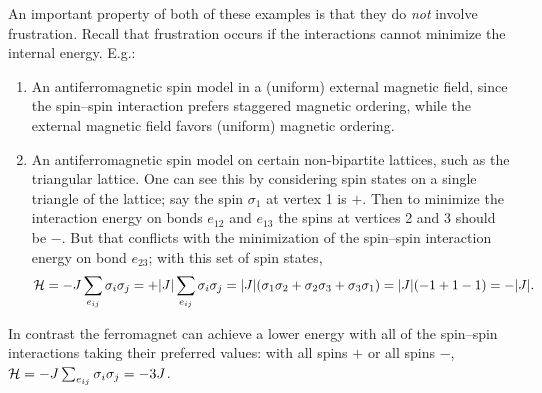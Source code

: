 An important property of both of these examples is that they do \emph{not} involve
frustration. Recall that frustration occurs if the interactions cannot minimize the internal
energy. E.g.:
\begin{enumerate}
  \item An antiferromagnetic spin model in a (uniform) external magnetic field, since the
    spin--spin interaction prefers staggered magnetic ordering, while the external magnetic field
    favors (uniform) magnetic ordering.
  \item An antiferromagnetic spin model on certain non-bipartite lattices, such as the
    triangular lattice. One can see this by considering spin states on a single triangle of the
    lattice; say the spin $\sigma_1$ at vertex 1 is $+$. Then to minimize the interaction energy
    on bonds $e_{12}$ and $e_{13}$ the spins at vertices 2 and 3 should be $-$. But that
    conflicts with the minimization of the spin--spin interaction energy on bond $e_{23}$; with
    this set of spin states,
    \begin{equation}
      \mathcal{H} = -J\sum_{e_{ij}}\sigma_i\sigma_j = +|J|\sum_{e_{ij}}\sigma_i\sigma_j
           = |J|(\sigma_1\sigma_2+\sigma_2\sigma_3+\sigma_3\sigma_1) = |J|(-1+1-1) = -|J| .
    \end{equation}
\end{enumerate}
In contrast the ferromagnet can achieve a lower energy with all of the spin--spin interactions
taking their preferred values: with all spins $+$ or all spins $-$,
$\mathcal{H} = -J\sum_{e_{ij}}\sigma_i\sigma_j = -3J$.

\begin{diagram}
\end{diagram}


